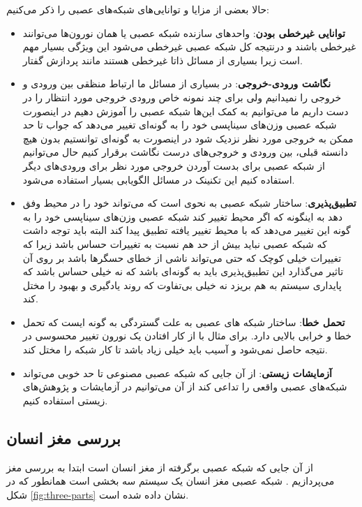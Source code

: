 \documentclass[11pt,a4paper,twocolumn]{article}
\begin{document}
حالا بعضی از مزایا و توانایی‌های شبکه‌های عصبی را ذکر می‌کنیم\cite[ص-۳]{haykin}:

\begin{itemize}
  \item 
\textbf{توانایی غیرخطی بودن}:
  واحدهای سازنده شبکه عصبی یا همان نورون‌ها می‌توانند غیرخطی باشند و درنتیجه کل شبکه عصبی غیرخطی می‌شود این ویژگی بسیار مهم است زیرا بسیاری از مسائل ذاتا غیرخطی هستند مانند پردازش گفتار.
  \item
\textbf{نگاشت ورودی-خروجی}:
در بسیاری از مسائل ما ارتباط منظقی بین ورودی و خروجی را نمیدانیم ولی برای چند نمونه خاص ورودی خروجی مورد انتظار را در دست داریم ما می‌توانیم به کمک این‌ها شبکه عصبی را آموزش دهیم در اینصورت شبکه عصبی وزن‌های سیناپسی خود را به گونه‌ای تغییر می‌دهد که جواب تا حد ممکن به خروجی مورد نظر نزدیک شود در اینصورت به گونه‌ای توانستیم بدون هیچ دانسته قبلی، بین ورودی و خروجی‌های درست نگاشت برقرار کنیم حال می‌توانیم از شبکه عصبی برای بدست آوردن خروجی مورد نظر برای ورودی‌های دیگر استفاده کنیم این تکنینک در مسائل الگویابی بسیار استفاده می‌شود.
\item
\textbf{تطبیق‌پذیری}:
ساختار شبکه عصبی به نحوی است که می‌تواند  خود را در محیط وفق دهد به اینگونه که اگر محیط تغییر کند شبکه عصبی وزن‌های سیناپسی خود را به گونه این تغییر می‌دهد که با محیط تغییر یافته تطبیق پیدا کند البته باید توجه داشت که شبکه عصبی نباید بیش از حد هم نسبت به تغییرات حساس باشد زیرا که تغییرات خیلی کوچک که حتی می‌تواند ناشی از خطای حسگرها باشد بر روی آن تاثیر می‌گذارد این تطبیق‌پذیری باید به گونه‌ای باشد که نه خیلی حساس باشد که پایداری سیستم به هم بریزد نه خیلی بی‌تفاوت که روند یادگیری و بهبود را مختل کند.
\item
\textbf{تحمل خطا}:
ساختار شبکه های عصبی به علت گستردگی به گونه ایست که تحمل خطا و خرابی بالایی دارد. برای مثال با از کار افتادن یک نورون تغییر محسوسی در نتیجه حاصل نمی‌شود و آسیب باید خیلی زیاد باشد تا کار شبکه را مختل کند.
\item
\textbf{آزمایشات زیستی}:
از آن جایی که شبکه عصبی مصنوعی تا حد خوبی می‌تواند شبکه‌های عصبی واقعی را تداعی کند از آن می‌توانیم در آزمایشات و پژوهش‌های زیستی استفاده کنیم.
\end{itemize}

\subsection{بررسی مغز انسان}
از آن جایی که شبکه عصبی برگرفته از مغز انسان است ابتدا به بررسی مغز می‌پردازیم . شبکه عصبی مغز انسان یک سیستم سه بخشی است همانطور که در شکل
\ref{fig:three-parts}
نشان داده شده است.
\end{document}
